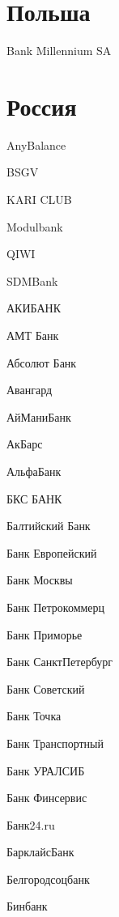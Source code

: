 \documentclass[a4paper,10pt,russian]{sphinxmanual}
\begin{document}
\section{Польша}
\label{\detokenize{banks:id10}}
\sphinxAtStartPar
Bank Millennium SA


\section{Россия}
\label{\detokenize{banks:id11}}
\sphinxAtStartPar
AnyBalance

\sphinxAtStartPar
BSGV

\sphinxAtStartPar
KARI CLUB

\sphinxAtStartPar
Modulbank

\sphinxAtStartPar
QIWI

\sphinxAtStartPar
SDM\sphinxhyphen{}Bank

\sphinxAtStartPar
АКИБАНК

\sphinxAtStartPar
АМТ Банк

\sphinxAtStartPar
Абсолют Банк

\sphinxAtStartPar
Авангард

\sphinxAtStartPar
АйМаниБанк

\sphinxAtStartPar
АкБарс

\sphinxAtStartPar
Альфа\sphinxhyphen{}Банк

\sphinxAtStartPar
БКС БАНК

\sphinxAtStartPar
Балтийский Банк

\sphinxAtStartPar
Банк Европейский

\sphinxAtStartPar
Банк Москвы

\sphinxAtStartPar
Банк Петрокоммерц

\sphinxAtStartPar
Банк Приморье

\sphinxAtStartPar
Банк Санкт\sphinxhyphen{}Петербург

\sphinxAtStartPar
Банк Советский

\sphinxAtStartPar
Банк Точка

\sphinxAtStartPar
Банк Транспортный

\sphinxAtStartPar
Банк УРАЛСИБ

\sphinxAtStartPar
Банк Финсервис

\sphinxAtStartPar
Банк24.ru

\sphinxAtStartPar
Барклайс\sphinxhyphen{}Банк

\sphinxAtStartPar
Белгородсоцбанк

\sphinxAtStartPar
Бинбанк
\end{document}
